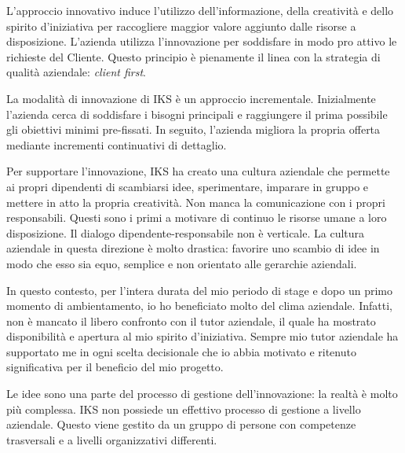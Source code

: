 L'approccio innovativo induce l'utilizzo dell'informazione, della creatività e 
dello spirito d'iniziativa per raccogliere maggior valore aggiunto dalle risorse a 
disposizione. L'azienda utilizza l'innovazione per soddisfare in modo pro attivo 
le richieste del Cliente. Questo principio è pienamente il linea con la strategia 
di qualità aziendale: \textit{client first}.

La modalità di innovazione di IKS è un approccio incrementale. Inizialmente 
l'azienda cerca di soddisfare i bisogni principali e raggiungere il prima 
possibile gli obiettivi minimi pre-fissati. In seguito, l'azienda migliora 
la propria offerta mediante incrementi continuativi di dettaglio. 

Per supportare l'innovazione, IKS ha creato una cultura aziendale che permette 
ai propri dipendenti di scambiarsi idee, sperimentare, imparare in gruppo e mettere in 
atto la propria creatività. Non manca la comunicazione con i propri responsabili. 
Questi sono i primi a motivare di continuo le risorse umane a loro disposizione. 
Il dialogo dipendente-responsabile non è verticale. La cultura aziendale in questa 
direzione è molto drastica: favorire uno scambio di idee in modo che esso sia  
equo, semplice e non orientato alle gerarchie aziendali. 

In questo contesto, per l'intera durata del mio periodo di stage e dopo un 
primo momento di ambientamento, io ho beneficiato molto del clima aziendale. 
Infatti, non è mancato il libero confronto con il tutor aziendale, il quale ha  
mostrato disponibilità e apertura al mio spirito d'iniziativa. Sempre mio tutor 
aziendale ha supportato me in ogni scelta decisionale che io abbia motivato e 
ritenuto significativa per il beneficio del mio progetto. 

Le idee sono una parte del processo di gestione dell'innovazione: la realtà è 
molto più complessa. IKS non possiede un effettivo processo di gestione a 
livello aziendale. Questo viene gestito da un gruppo di persone con competenze 
trasversali e a livelli organizzativi differenti. 


\newpage 